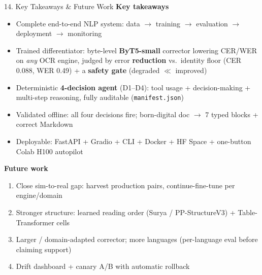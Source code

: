 \documentclass[10pt,aspectratio=169]{beamer}
\begin{document}
\begin{frame}{14. Key Takeaways \& Future Work}
\textbf{Key takeaways}
\begin{itemize}\small
  \item Complete end-to-end NLP system: data $\rightarrow$ training $\rightarrow$ evaluation $\rightarrow$ deployment $\rightarrow$ monitoring
  \item Trained differentiator: byte-level \textbf{ByT5-small} corrector lowering CER/WER on \emph{any} OCR engine, judged by error \textbf{reduction} vs.\ identity floor (CER 0.088, WER 0.49) + a \textbf{safety gate} (degraded $\ll$ improved)
  \item Deterministic \textbf{4-decision agent} (D1--D4): tool usage + decision-making + multi-step reasoning, fully auditable (\texttt{manifest.json})
  \item Validated offline: all four decisions fire; born-digital doc $\rightarrow$ 7 typed blocks + correct Markdown
  \item Deployable: FastAPI + Gradio + CLI + Docker + HF Space + one-button Colab H100 autopilot
\end{itemize}

\textbf{Future work}
\begin{enumerate}\small
  \item Close sim-to-real gap: harvest production pairs, continue-fine-tune per engine/domain
  \item Stronger structure: learned reading order (Surya / PP-StructureV3) + Table-Transformer cells
  \item Larger / domain-adapted corrector; more languages (per-language eval before claiming support)
  \item Drift dashboard + canary A/B with automatic rollback
\end{enumerate}
\end{frame}
\end{document}
